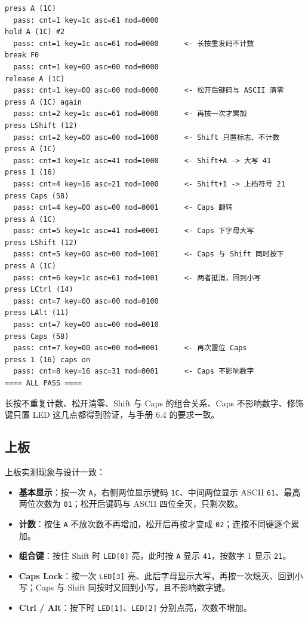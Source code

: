 \documentclass[12pt, a4paper]{ctexart}
\begin{document}
\begin{lstlisting}[language={}, numbers=none, frame=single]
press A (1C)
  pass: cnt=1 key=1c asc=61 mod=0000
hold A (1C) #2
  pass: cnt=1 key=1c asc=61 mod=0000      <- 长按重发码不计数
break F0
  pass: cnt=1 key=00 asc=00 mod=0000
release A (1C)
  pass: cnt=1 key=00 asc=00 mod=0000      <- 松开后键码与 ASCII 清零
press A (1C) again
  pass: cnt=2 key=1c asc=61 mod=0000      <- 再按一次才累加
press LShift (12)
  pass: cnt=2 key=00 asc=00 mod=1000      <- Shift 只置标志、不计数
press A (1C)
  pass: cnt=3 key=1c asc=41 mod=1000      <- Shift+A -> 大写 41
press 1 (16)
  pass: cnt=4 key=16 asc=21 mod=1000      <- Shift+1 -> 上档符号 21
press Caps (58)
  pass: cnt=4 key=00 asc=00 mod=0001      <- Caps 翻转
press A (1C)
  pass: cnt=5 key=1c asc=41 mod=0001      <- Caps 下字母大写
press LShift (12)
  pass: cnt=5 key=00 asc=00 mod=1001      <- Caps 与 Shift 同时按下
press A (1C)
  pass: cnt=6 key=1c asc=61 mod=1001      <- 两者抵消，回到小写
press LCtrl (14)
  pass: cnt=7 key=00 asc=00 mod=0100
press LAlt (11)
  pass: cnt=7 key=00 asc=00 mod=0010
press Caps (58)
  pass: cnt=7 key=00 asc=00 mod=0001      <- 再次置位 Caps
press 1 (16) caps on
  pass: cnt=8 key=16 asc=31 mod=0001      <- Caps 不影响数字
==== ALL PASS ====
\end{lstlisting}

长按不重复计数、松开清零、Shift 与 Caps 的组合关系、Caps 不影响数字、修饰键只置 LED 这几点都得到验证，与手册 6.4 的要求一致。

\subsection{上板}
上板实测现象与设计一致：
\begin{itemize}
    \item \textbf{基本显示}：按一次 \texttt{A}，右侧两位显示键码 \texttt{1C}、中间两位显示 ASCII \texttt{61}、最高两位次数为 \texttt{01}；松开后键码与 ASCII 四位全灭，只剩次数。
    \item \textbf{计数}：按住 \texttt{A} 不放次数不再增加，松开后再按才变成 \texttt{02}；连按不同键逐个累加。
    \item \textbf{组合键}：按住 Shift 时 \texttt{LED[0]} 亮，此时按 \texttt{A} 显示 \texttt{41}，按数字 1 显示 \texttt{21}。
    \item \textbf{Caps Lock}：按一次 \texttt{LED[3]} 亮、此后字母显示大写，再按一次熄灭、回到小写；Caps 与 Shift 同按时又回到小写，且不影响数字键。
    \item \textbf{Ctrl / Alt}：按下时 \texttt{LED[1]}、\texttt{LED[2]} 分别点亮，次数不增加。
\end{itemize}
\end{document}
